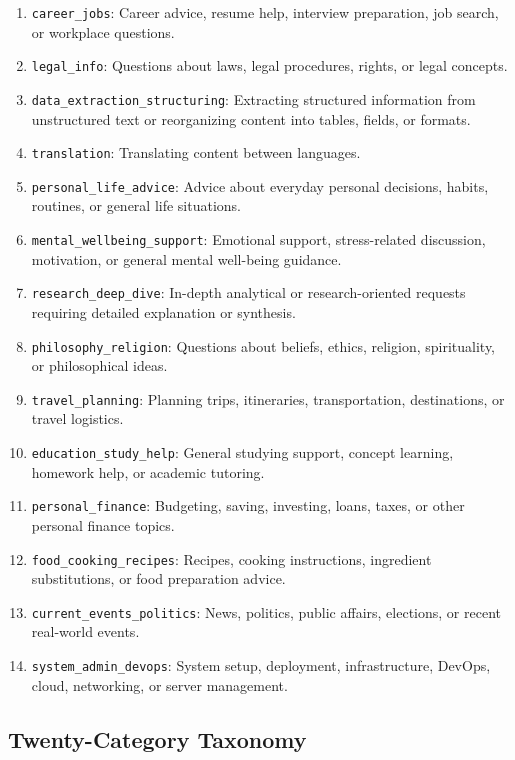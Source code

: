 \documentclass{article}
\begin{document}
\begin{enumerate}
    \item \texttt{career\_jobs}: Career advice, resume help, interview preparation, job search, or workplace questions.
    \item \texttt{legal\_info}: Questions about laws, legal procedures, rights, or legal concepts.
    \item \texttt{data\_extraction\_structuring}: Extracting structured information from unstructured text or reorganizing content into tables, fields, or formats.
    \item \texttt{translation}: Translating content between languages.
    \item \texttt{personal\_life\_advice}: Advice about everyday personal decisions, habits, routines, or general life situations.
    \item \texttt{mental\_wellbeing\_support}: Emotional support, stress-related discussion, motivation, or general mental well-being guidance.
    \item \texttt{research\_deep\_dive}: In-depth analytical or research-oriented requests requiring detailed explanation or synthesis.
    \item \texttt{philosophy\_religion}: Questions about beliefs, ethics, religion, spirituality, or philosophical ideas.
    \item \texttt{travel\_planning}: Planning trips, itineraries, transportation, destinations, or travel logistics.
    \item \texttt{education\_study\_help}: General studying support, concept learning, homework help, or academic tutoring.
    \item \texttt{personal\_finance}: Budgeting, saving, investing, loans, taxes, or other personal finance topics.
    \item \texttt{food\_cooking\_recipes}: Recipes, cooking instructions, ingredient substitutions, or food preparation advice.
    \item \texttt{current\_events\_politics}: News, politics, public affairs, elections, or recent real-world events.
    \item \texttt{system\_admin\_devops}: System setup, deployment, infrastructure, DevOps, cloud, networking, or server management.
\end{enumerate}

\subsection{Twenty-Category Taxonomy}
\label{app:intent_20}
\end{document}
